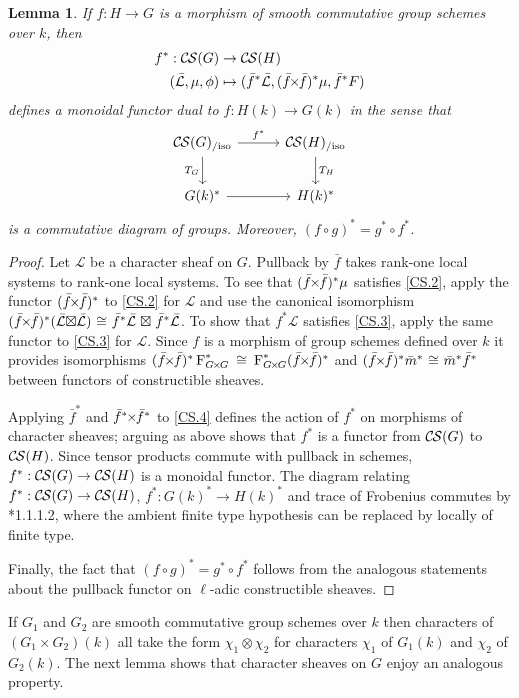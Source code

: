\documentclass[10pt]{amsart}
\theoremstyle{plain}
\newtheorem{lemma}[theorem]{Lemma}
\theoremstyle{definition}
\newcommand{\Fq}{k}
\newcommand{\Frob}[1]{\operatorname{F}_{#1}}
\newcommand{\iso}{{\ \cong\ }}
\newcommand{\TrFrob}[1]{T_{#1}}
\newcommand{\cs}[1]{{\mathcal{#1}}}
\newcommand{\gcs}[1]{{\mathcal{\bar #1}}}
\newcommand{\CS}{{\mathcal{C\hskip-0.8pt S}}}
\newcommand{\CSiso}[1]{\CS(#1)_{/\text{iso}}}
\renewcommand{\bf}{\bar{f}}
\newcommand{\bm}{\bar{m}}
\newcommand{\tight}[3]{\hspace{-#1pt}{#2}\hspace{-#3pt}}
\newcommand{\bfxf}{\text{$\bar{f} \tight{1}{\times}{1} \bar{f}$}}
\newcommand{\GxxG}{\text{$G \tight{1}{\times}{1} G$}}
\newcommand{\LxL}{\text{$\gcs{L} \tight{0}{\boxtimes}{0} \gcs{L}$}}
\begin{document}
\begin{lemma}\label{lem:pullback}
  If $f : H\to G$ is a morphism of smooth commutative group schemes over $\Fq$, then
  \begin{align*}
  f^* : \CS(G) &\to \CS(H) \\
  (\gcs{L},\mu,\phi) &\mapsto (\bf^*\gcs{L},(\bfxf)^*\mu,\bf^*F)
  \end{align*}
  defines a monoidal functor dual to $f \colon H(\Fq) \to G(\Fq)$ in the sense that
  \[
  \begin{tikzcd}[row sep=20, column sep=30]
   \CSiso{G} \rar{f^*} \arrow[swap]{d}{\TrFrob{G}} & \CSiso{H} \dar{\TrFrob{H}} \\
   G(\Fq)^* \rar & H(\Fq)^*
  \end{tikzcd}
  \]
  is a commutative diagram of groups.  Moreover, $(f\circ g)^* = g^* \circ f^*$.
\end{lemma}
\begin{proof}
  Let $\cs{L}$ be a character sheaf on $G$. 
  Pullback by $\bf$ takes rank-one local systems to rank-one local systems.
  To see that $(\bfxf)^* \mu$ satisfies \ref{CS.2},
  apply the functor $(\bfxf)^*$
  to \ref{CS.2} for $\cs{L}$ and use the canonical isomorphism
  $(\bfxf)^*(\LxL) \iso \bf^*\gcs{L} \tight{-3}{\boxtimes}{-3} \bf^*\gcs{L}$.
  To show that $f^*\cs{L}$ satisfies
  \ref{CS.3}, apply the same functor to \ref{CS.3} for $\cs{L}$.
  Since $f$ is a morphism of group schemes defined over $\Fq$
  it provides isomorphisms $(\bfxf)^*\Frob{\GxxG}^* \iso \Frob{\GxxG}^* (\bfxf)^*$
  and $(\bfxf)^* \bm^*\iso \bm^* \bf^*$ between functors of constructible sheaves.

  Applying $\bf^*$ and $\bf^* \tight{1}{\times}{1}\bf^*$ to \ref{CS.4} defines the action
  of $f^*$ on morphisms of character sheaves; arguing as above shows that $f^*$ is
  a functor from $\CS(G)$ to $\CS(H)$.  Since tensor products commute with pullback in schemes,
  $f^* : \CS(G) \to \CS(H)$ is a monoidal functor.
  The diagram relating $f^* : \CS(G) \to \CS(H)$, $f^* : G(k)^* \to H(k)^*$ and trace of Frobenius
  commutes by \cite{laumon:87a}*{1.1.1.2}, where the ambient
 finite type hypothesis can be replaced by locally of finite type.

  Finally, the fact that $(f\circ g)^* = g^* \circ f^*$ follows from the analogous
  statements about the pullback functor on $\ell$-adic constructible sheaves.
\end{proof}

If $G_1$ and $G_2$ are smooth commutative group schemes over $\Fq$ then characters of $(G_1 \times G_2)(\Fq)$ all take the form $\chi_1\otimes \chi_2$ for characters $\chi_1$ of $G_1(\Fq)$ and $\chi_2$ of $G_2(\Fq)$. 
The next lemma shows that character sheaves on $G$ enjoy an analogous property.
\end{document}
